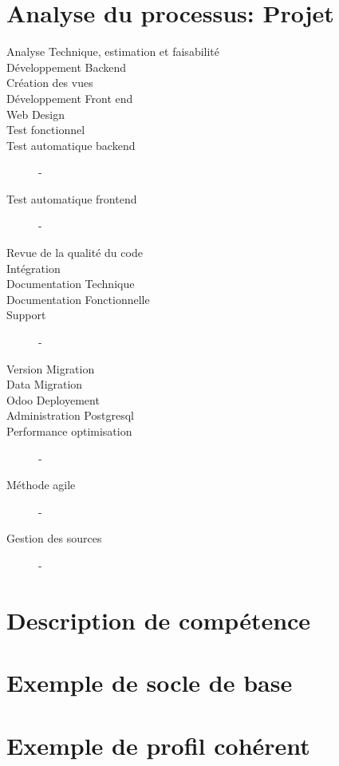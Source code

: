 \section{Analyse du processus: Projet}
\begin{description}
    \item[Analyse Technique, estimation et faisabilité] 
    \item[Développement Backend]
    \item[Création des vues]
    \item[Développement Front end]
    \item[Web Design]
    \item[Test fonctionnel]
    \item[Test automatique backend] -
    \item[Test automatique frontend] -
    \item[Revue de la qualité du code]
    \item[Intégration]
    \item[Documentation Technique]
    \item[Documentation Fonctionnelle]
    \item[Support] -
    \item[Version Migration]
    \item[Data Migration]
    \item[Odoo Deployement]
    \item[Administration Postgresql]
    \item[Performance optimisation] - 
    \item[Méthode agile]       -
    \item[Gestion des sources] -
\end{description}

\section{Description de compétence}


\section{Exemple de socle de base}

\section{Exemple de profil cohérent}
